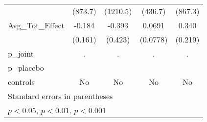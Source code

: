 {\begin{tabular}{l*{4}{c}}
            &     (873.7)         &    (1210.5)         &     (436.7)         &     (867.3)         \\
\addlinespace
Avg\_Tot\_Effect&      -0.184         &      -0.393         &      0.0691         &       0.340         \\
            &     (0.161)         &     (0.423)         &    (0.0778)         &     (0.219)         \\
\midrule
p\_joint     &           .         &           .         &           .         &           .         \\
p\_placebo   &                     &                     &                     &                     \\
controls    &          No         &          No         &          No         &          No         \\
\bottomrule
\multicolumn{5}{l}{\footnotesize Standard errors in parentheses}\\
\multicolumn{5}{l}{\footnotesize \sym{*} \(p<0.05\), \sym{**} \(p<0.01\), \sym{***} \(p<0.001\)}\\
\end{tabular}
}
